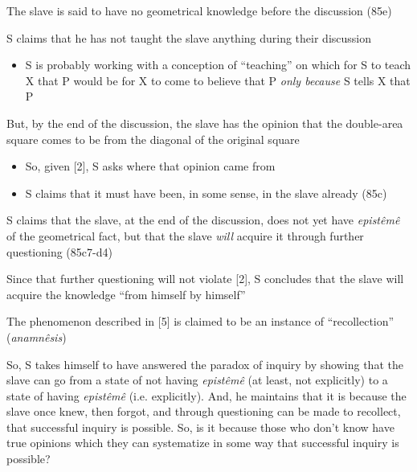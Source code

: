 \documentclass[10 pt]{article}
\begin{document}
\noindent [1] The slave is said to have no geometrical knowledge before the discussion (85e)
\vspace*{2mm}

\noindent [2] S claims that he has not taught the slave anything during their discussion
\begin{itemize}\item{S is probably working with a conception of ``teaching'' on which for S to teach X that P would be for X to come to believe that P \emph{only because} S tells X that P}\end{itemize}

\noindent [3] But, by the end of the discussion, the slave has the opinion that the double-area square comes to be from the diagonal of the original square

\begin{itemize}\item{So, given [2], S asks where that opinion came from}\item{S claims that it must have been, in some sense, in the slave already (85c)}\end{itemize}

\noindent [4] S claims that the slave, at the end of the discussion, does not yet have \emph{epist\^{e}m\^{e}} of the geometrical fact, but that the slave \emph{will} acquire it through further questioning (85c7-d4)
\vspace*{2mm}

\noindent [5] Since that further questioning will not violate [2], S concludes that the slave will acquire the knowledge ``from himself by himself''
\vspace*{2mm}

\noindent [6] The phenomenon described in [5] is claimed to be an instance of ``recollection'' (\emph{anamn\^{e}sis})
\vspace*{2mm}

\noindent So, S takes himself to have answered the paradox of inquiry by showing that the slave can go from a state of not having \emph{epist\^{e}m\^{e}} (at least, not explicitly) to a state of having \emph{epist\^{e}m\^{e}} (i.e. explicitly). And, he maintains that it is because the slave once knew, then forgot, and through questioning can be made to recollect, that successful inquiry is possible. So, is it because those who don't know have true opinions which they can systematize in some way that successful inquiry is possible?
\vspace*{2mm}
\end{document}

